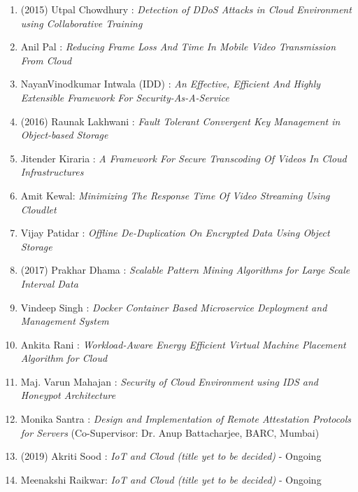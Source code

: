 \begin{enumerate}

\item	(2015) Utpal Chowdhury : 	\textit{	Detection of DDoS Attacks in Cloud Environment using Collaborative Training}
\item		Anil Pal : 	\textit{	Reducing Frame Loss And Time In Mobile Video Transmission From Cloud}	
\item		NayanVinodkumar Intwala (IDD) : 	\textit{	An Effective, Efficient And Highly Extensible Framework For Security-As-A-Service}	


\item	(2016) Raunak Lakhwani : 	\textit{Fault Tolerant Convergent Key Management in Object-based Storage}
\item		Jitender Kiraria : 	\textit{	A Framework For Secure Transcoding Of Videos In Cloud Infrastructures}
\item		Amit Kewal: 	\textit{	Minimizing The Response Time Of Video Streaming Using Cloudlet}
\item		Vijay Patidar : 	\textit{	Offline De-Duplication On Encrypted Data Using Object Storage}	


\item	(2017) Prakhar Dhama : 	\textit{	Scalable Pattern Mining Algorithms for Large Scale Interval Data}
\item		Vindeep Singh : 	\textit{	Docker Container Based Microservice Deployment and Management System}	
\item		Ankita Rani : 	\textit{	Workload-Aware Energy Efficient Virtual Machine Placement Algorithm for Cloud}	
\item		Maj. Varun Mahajan : 	\textit{	Security of Cloud Environment using IDS and Honeypot Architecture}
\item		Monika Santra : 	\textit{	Design and Implementation of Remote Attestation Protocols for Servers} (Co-Supervisor:	Dr. Anup Battacharjee, BARC, Mumbai)


\item	(2019) Akriti Sood	: 	\textit{IoT and Cloud (title yet to be decided)}	-	Ongoing
\item		Meenakshi Raikwar: 	\textit{IoT and Cloud (title yet to be decided)}	-	Ongoing
	\end{enumerate}